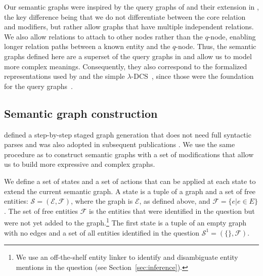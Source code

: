 \documentclass[11pt]{article}
\begin{document}
\begin{figure}[t]
\begin{minipage}{0.57\linewidth}
\begin{center}
    \end{center}
  \end{minipage}
\end{figure}

Our semantic graphs were inspired by the query graphs of  and their extension in  , the key difference being that we do not differentiate between the core relation and modifiers, but rather allow graphs that have multiple independent relations. We also allow relations to attach to other nodes rather than the $q$-node, enabling longer relation paths between a known entity and the $q$-node. Thus, the semantic graphs defined here are a superset of the query graphs in  and allow us to model more complex meanings.
Consequently, they also correspond to the formalized representations used by  and the simple $\lambda$-DCS~\cite{Berant2013}, since those were the foundation for the query graphs~\cite{Yih2015}.


\subsection{Semantic graph construction}
\label{sec:graph-construction}

 defined a step-by-step staged graph generation that does not need full syntactic parses and was also adopted in subsequent publications \cite{Bao2016,Peng2017}. We use the same procedure as  to construct semantic graphs with a set of modifications that allow us to build more expressive and complex graphs.

We define a set of states and a set of actions that can be applied at each state to extend the current semantic graph. A state is a tuple of a graph and a set of free entities: $\mathcal{S} = (\mathcal{E}, \mathcal{F})$, where the graph is $\mathcal{E}$, as defined above, and $\mathcal{F} = \{e | e \in E \}$. The set of free entities $\mathcal{F}$ is the entities that were identified in the question but were not yet added to the graph.\footnote{We use an off-the-shelf entity linker to identify and disambiguate entity mentions in the question (see Section~\ref{sec:inference}).} The first state is a tuple of an empty graph with no edges and a set of all entities identified in the question $\mathcal{S}^1 = (\{\}, \mathcal{F})$.
\end{document}
